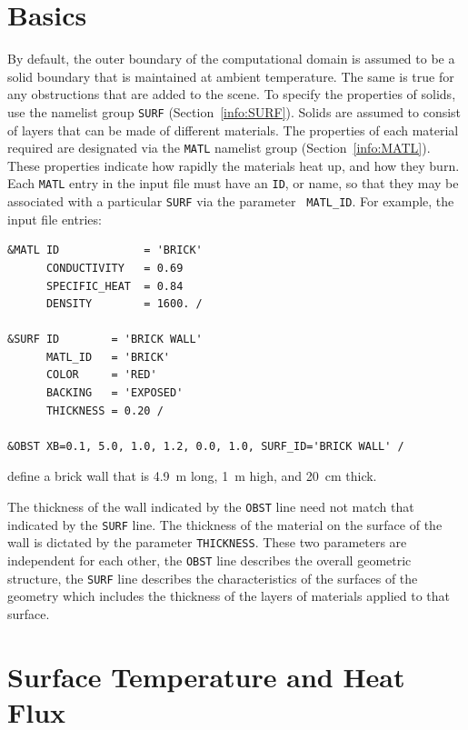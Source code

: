 \documentclass[11pt]{book}
\newcommand{\ct}{\tt\small}
\begin{document}
\section{Basics}
\label{info:SURF_MATL_Basics}

By default, the outer boundary of the computational domain is assumed
to be a solid boundary that is maintained at ambient temperature. The
same is true for any obstructions that are added to the scene. To
specify the properties of solids, use the namelist group {\ct SURF}
(Section~\ref{info:SURF}). Solids are assumed to
consist of layers that can be made of different materials.  The
properties of each material required are designated via the {\ct MATL}
namelist group (Section~\ref{info:MATL}).  These properties indicate how
rapidly the materials heat up, and how they burn.  Each {\ct MATL}
entry in the input file must have an {\ct ID}, or name, so that they
may be associated with a particular {\ct SURF} via the parameter {\ct
MATL\_ID}.  For example, the input file entries:

\footnotesize
\begin{verbatim}
&MATL ID             = 'BRICK'
      CONDUCTIVITY   = 0.69
      SPECIFIC_HEAT  = 0.84
      DENSITY        = 1600. /

&SURF ID        = 'BRICK WALL'
      MATL_ID   = 'BRICK'
      COLOR     = 'RED'
      BACKING   = 'EXPOSED'
      THICKNESS = 0.20 /

&OBST XB=0.1, 5.0, 1.0, 1.2, 0.0, 1.0, SURF_ID='BRICK WALL' /
\end{verbatim}
\normalsize

\noindent
define a brick wall that is 4.9~m long, 1~m high, and 20~cm thick.
\begin{warning}
\noindent
The thickness of the wall indicated by the {\ct OBST} line need not
match that indicated by the {\ct SURF} line. The thickness of the material on the surface of the wall
is dictated by the parameter {\ct THICKNESS}.  These two parameters are independent for each other,
the {\ct OBST} line describes the overall geometric structure, the {\ct SURF} line describes the
characteristics of the surfaces of the geometry which includes the thickness of the layers of
materials applied to that surface.
\end{warning}



\clearpage

\section{Surface Temperature and Heat Flux}
\end{document}
